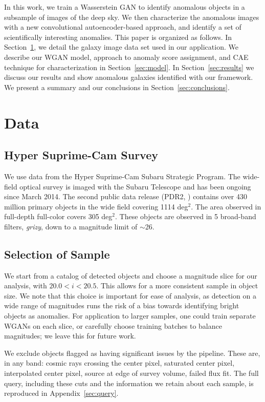 \documentclass[fleqn,usenatbib,useAMS]{mnras}
\begin{document}
In this work, we train a Wasserstein GAN to identify anomalous objects in a subsample of images of the deep sky.
We then characterize the anomalous images with a new convolutional autoencoder-based approach, and identify a set of scientifically interesting anomalies.
This paper is organized as follows.
In Section~\ref{sec:data}, we detail the galaxy image data set used in our application.
We describe our WGAN model, approach to anomaly score assignment, and CAE technique for characterization in Section~\ref{sec:model}.
In Section~\ref{sec:results} we discuss our results and show anomalous galaxies identified with our framework.
We present a summary and our conclusions in Section~\ref{sec:conclusions}.

\section{Data}
\label{sec:data}

\subsection{Hyper Suprime-Cam Survey}

We use data from the Hyper Suprime-Cam Subaru Strategic Program.
The wide-field optical survey is imaged with the Subaru Telescope and has been ongoing since March 2014.
The second public data release (PDR2, \citealt{Aihara2014}) contains over 430 million primary objects in the wide field covering 1114 deg$^2$. The area observed in full-depth full-color covers 305 deg$^2$.
These objects are observed in 5 broad-band filters, \textit{grizy}, down to a magnitude limit of $\sim$26. 


\subsection{Selection of Sample} 

We start from a catalog of detected objects and choose a magnitude slice for our analysis, with $20.0<i<20.5$. 
This allows for a more consistent sample in object size. We note that this choice is important for ease of analysis, as detection on a wide range of magnitudes runs the risk of a bias towards identifying bright objects as anomalies.
For application to larger samples, one could train separate WGANs on each slice, or carefully choose training batches to balance magnitudes; we leave this for future work.

We exclude objects flagged as having significant issues by the pipeline. 
These are, in any band: cosmic rays crossing the center pixel, saturated center pixel, interpolated center pixel, source at edge of survey volume, failed flux fit.
The full query, including these cuts and the information we retain about each sample, is reproduced in Appendix~\ref{sec:query}.
\end{document}
